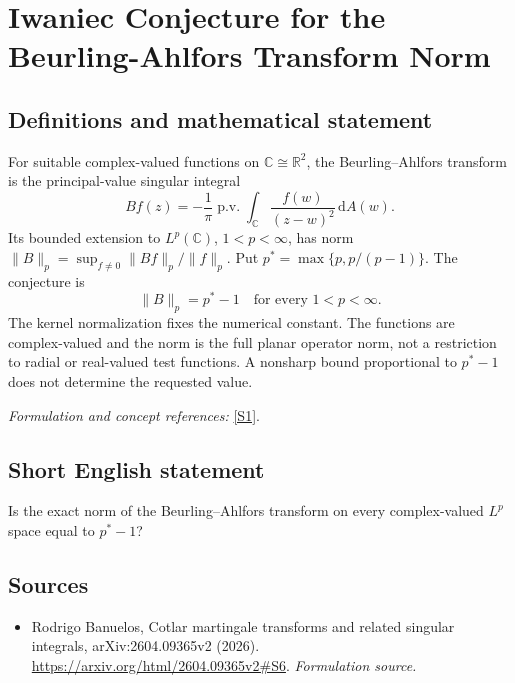 \documentclass[11pt]{article}
\begin{document}
\section*{\texorpdfstring{Iwaniec Conjecture for the Beurling-Ahlfors Transform Norm}{Iwaniec Conjecture for the Beurling-Ahlfors Transform Norm}}\label{statement}
\subsection{Definitions and mathematical statement}
For suitable complex-valued functions on ${\mathbb{C}}\cong{\mathbb{R}}^2$, the Beurling--Ahlfors transform is the principal-value singular integral
\[
 Bf(z)=-\frac1\pi\operatorname{p.v.}\int_{{\mathbb{C}}}
 \frac{f(w)}{(z-w)^2}{\,\mathrm{d}} A(w).
\]
Its bounded extension to $L^p({\mathbb{C}})$, $1<p<\infty$, has norm $\|B\|_p=\sup_{f\ne0}\|Bf\|_p/\|f\|_p$. Put $p^*=\max\{p,p/(p-1)\}$. The conjecture is
\[
 \|B\|_p=p^*-1\quad\text{for every }1<p<\infty.
\]
The kernel normalization fixes the numerical constant. The functions are complex-valued and the norm is the full planar operator norm, not a restriction to radial or real-valued test functions. A nonsharp bound proportional to $p^*-1$ does not determine the requested value.
\par\smallskip\textit{Formulation and concept references:} \href{https://arxiv.org/html/2604.09365v2#S6}{[S1]}.

\subsection{Short English statement}
Is the exact norm of the Beurling--Ahlfors transform on every complex-valued $L^p$ space equal to $p^*-1$?
\subsection{Sources}
\begin{itemize}
\item[S1]Rodrigo Banuelos, Cotlar martingale transforms and related singular integrals, arXiv:2604.09365v2 (2026).
\url{https://arxiv.org/html/2604.09365v2#S6}.
\textit{Formulation source.}
\end{itemize}
\end{document}
